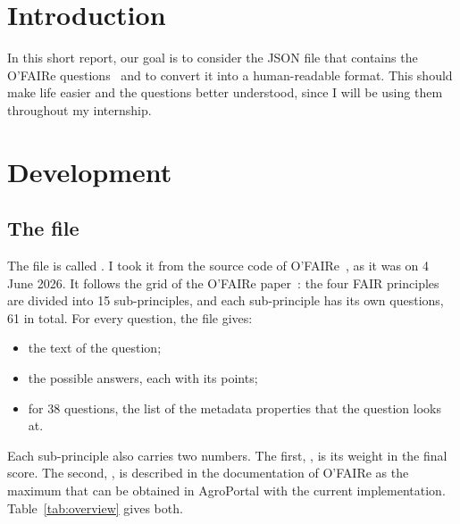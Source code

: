 \documentclass[11pt,a4paper]{article}
\begin{document}
\makereporttitlepage

\section{Introduction}

In this short report, our goal is to consider the JSON file that contains the O'FAIRe
questions~\cite{ofaireconfig} and to convert it into a human-readable format. This should make
life easier and the questions better understood, since I will be using them throughout my
internship.

\section{Development}

\subsection{The file}

The file is called . I took it from the source code of
O'FAIRe~\cite{ofaireconfig}, as it was on 4 June 2026. It follows the grid of the O'FAIRe
paper~\cite{amdouni2022faire}: the four FAIR principles are divided into 15 sub-principles, and
each sub-principle has its own questions, 61 in total. For every question, the
file gives:
\begin{itemize}
  \item the text of the question;
  \item the possible answers, each with its points;
  \item for 38 questions, the list of the metadata properties that the question looks at.
\end{itemize}

Each sub-principle also carries two numbers. The first, , is its weight in the
final score. The second, , is described in the documentation of O'FAIRe
as the maximum that can be obtained in AgroPortal with the current implementation.
Table~\ref{tab:overview} gives both.
\end{document}
